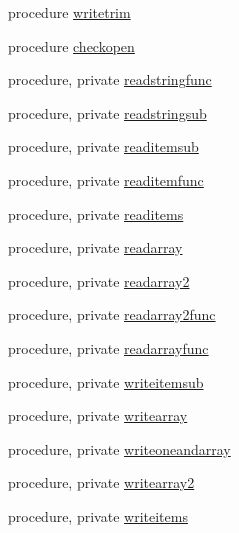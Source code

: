 \begin{DoxyCompactItemize}
\item 
procedure \mbox{\hyperlink{structfileutils_1_1tfilestream_ae362da00afea500efa020a1c9879a2e5}{writetrim}}
\item 
procedure \mbox{\hyperlink{structfileutils_1_1tfilestream_a2da290d67309dc43c6858bb8d5568e9e}{checkopen}}
\item 
procedure, private \mbox{\hyperlink{structfileutils_1_1tfilestream_acda5e8c36e6b9f7291018f3de5625d50}{readstringfunc}}
\item 
procedure, private \mbox{\hyperlink{structfileutils_1_1tfilestream_abca5180b667ad84fca9f1bf4a94c9f3f}{readstringsub}}
\item 
procedure, private \mbox{\hyperlink{structfileutils_1_1tfilestream_acb530785bf5834ad47798421c946632b}{readitemsub}}
\item 
procedure, private \mbox{\hyperlink{structfileutils_1_1tfilestream_ad125856e9fe396573b34f410698ad5d9}{readitemfunc}}
\item 
procedure, private \mbox{\hyperlink{structfileutils_1_1tfilestream_ae50e3d80385fe3fc94e0bee3ca233e24}{readitems}}
\item 
procedure, private \mbox{\hyperlink{structfileutils_1_1tfilestream_a4cc4e5507c5109e1fd1072db3c47280d}{readarray}}
\item 
procedure, private \mbox{\hyperlink{structfileutils_1_1tfilestream_a74d34861927de554b6d5789dd4ebc813}{readarray2}}
\item 
procedure, private \mbox{\hyperlink{structfileutils_1_1tfilestream_a5d46b95d8b8dc55a248e44b9d2b50f1f}{readarray2func}}
\item 
procedure, private \mbox{\hyperlink{structfileutils_1_1tfilestream_acc22eae6b934810e0e2100325eff3126}{readarrayfunc}}
\item 
procedure, private \mbox{\hyperlink{structfileutils_1_1tfilestream_a7bdfd7700fb9e3bef17490c72b9cf70b}{writeitemsub}}
\item 
procedure, private \mbox{\hyperlink{structfileutils_1_1tfilestream_a954749d040cadd592bd5c55b7938f14a}{writearray}}
\item 
procedure, private \mbox{\hyperlink{structfileutils_1_1tfilestream_a15e1a2b731748ffcd09bc70480ad80f0}{writeoneandarray}}
\item 
procedure, private \mbox{\hyperlink{structfileutils_1_1tfilestream_aa034c1872f9474a8cfa169e6ae70e2e1}{writearray2}}
\item 
procedure, private \mbox{\hyperlink{structfileutils_1_1tfilestream_acbc3db2c323be7d5c851c86bfd0a9ccd}{writeitems}}
\item 

\end{DoxyCompactItemize}
